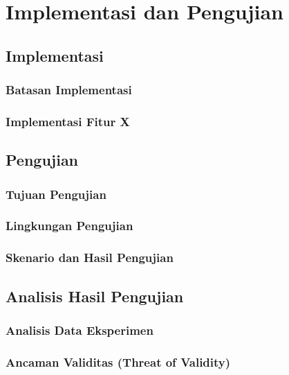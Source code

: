 


\chapter{Implementasi dan Pengujian}

\section{Implementasi}

\subsection{Batasan Implementasi}

\subsection{Implementasi Fitur X}

\section{Pengujian}

\subsection{Tujuan Pengujian}

\subsection{Lingkungan Pengujian}

\subsection{Skenario dan Hasil Pengujian}

\section{Analisis Hasil Pengujian} \label{sec:analisis-hasil-pengujian}

\subsection{Analisis Data Eksperimen}

\subsection{Ancaman Validitas (Threat of Validity)}
